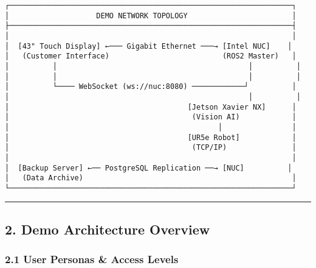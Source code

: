 \documentclass[
]{article}
\begin{document}
\begin{verbatim}
┌─────────────────────────────────────────────────────────────────┐
│                    DEMO NETWORK TOPOLOGY                        │
├─────────────────────────────────────────────────────────────────┤
│                                                                 │
│  [43" Touch Display] ←─── Gigabit Ethernet ───→ [Intel NUC]    │
│   (Customer Interface)                          (ROS2 Master)   │
│          │                                            │          │
│          │                                            │          │
│          └──── WebSocket (ws://nuc:8080) ────────────┘          │
│                                                       │          │
│                                         [Jetson Xavier NX]      │
│                                          (Vision AI)            │
│                                                │                │
│                                         [UR5e Robot]            │
│                                          (TCP/IP)               │
│                                                                 │
│  [Backup Server] ←── PostgreSQL Replication ──→ [NUC]          │
│   (Data Archive)                                                │
└─────────────────────────────────────────────────────────────────┘
\end{verbatim}

\begin{center}\rule{0.5\linewidth}{0.5pt}\end{center}

\hypertarget{demo-architecture-overview}{%
\subsection{2. Demo Architecture
Overview}\label{demo-architecture-overview}}

\hypertarget{user-personas-access-levels}{%
\subsubsection{2.1 User Personas \& Access
Levels}\label{user-personas-access-levels}}
\end{document}
